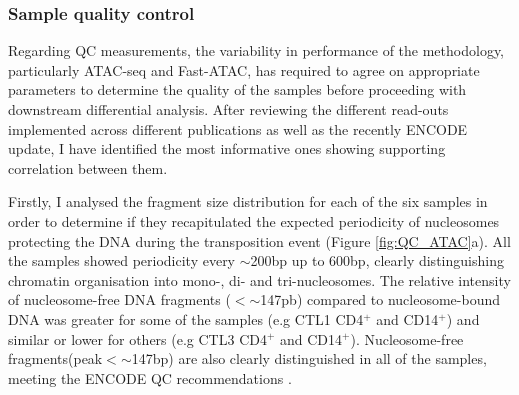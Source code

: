 \subsubsection{Sample quality control}
Regarding QC measurements, the variability in performance of the methodology, particularly ATAC-seq and Fast-ATAC, has required to agree on appropriate parameters to determine the quality of the samples before proceeding with downstream differential analysis. After reviewing the different read-outs implemented across different publications as well as the recently ENCODE update, I have identified the most informative ones showing supporting correlation between them.

Firstly, I analysed the fragment size distribution for each of the six samples in order to determine if they recapitulated the expected periodicity of nucleosomes protecting the DNA during the transposition event (Figure \ref{fig:QC_ATAC}a). All the samples showed periodicity every $\sim$200bp up to 600bp, clearly distinguishing chromatin organisation into mono-, di- and tri-nucleosomes. The relative intensity of nucleosome-free DNA fragments ($<$$\sim$147pb) compared to nucleosome-bound DNA was greater for some of the samples (e.g CTL1 CD4$^+$ and CD14$^+$) and similar or lower for others (e.g CTL3 CD4$^+$ and CD14$^+$). Nucleosome-free fragments(peak$<$$\sim$147bp) are also clearly distinguished in all of the samples, meeting the ENCODE QC recommendations \parencite{ENCODE}.


